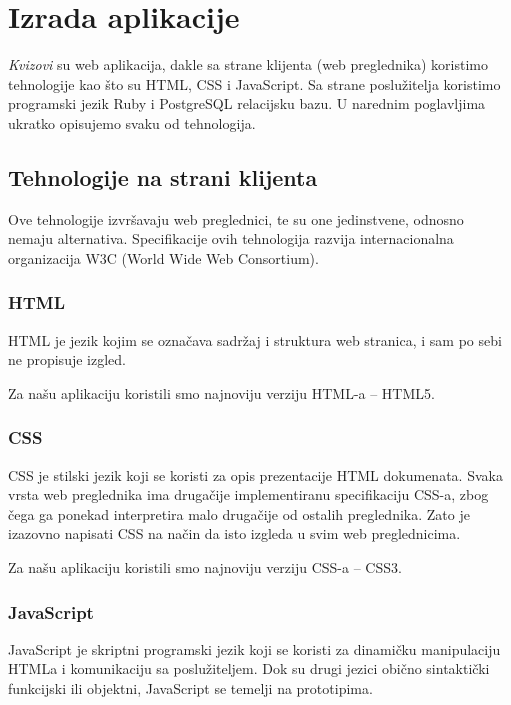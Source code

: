 \documentclass{scrreprt}
\begin{document}
\section{Izrada aplikacije}

\emph{Kvizovi} su web aplikacija, dakle sa strane klijenta (web preglednika)
koristimo tehnologije kao što su HTML, CSS i JavaScript. Sa strane poslužitelja
koristimo programski jezik Ruby i PostgreSQL relacijsku bazu. U narednim
poglavljima ukratko opisujemo svaku od tehnologija.

\subsection{Tehnologije na strani klijenta}

Ove tehnologije izvršavaju web preglednici, te su one jedinstvene, odnosno
nemaju alternativa. Specifikacije ovih tehnologija razvija internacionalna
organizacija W3C (World Wide Web Consortium).

\subsubsection{HTML}

HTML je jezik kojim se označava sadržaj i struktura web stranica, i sam po sebi
ne propisuje izgled.

Za našu aplikaciju koristili smo najnoviju verziju HTML-a -- HTML5.

\subsubsection{CSS}

CSS je stilski jezik koji se koristi za opis prezentacije HTML dokumenata. Svaka
vrsta web preglednika ima drugačije implementiranu specifikaciju CSS-a, zbog
čega ga ponekad interpretira malo drugačije od ostalih preglednika. Zato je
izazovno napisati CSS na način da isto izgleda u svim web preglednicima.

Za našu aplikaciju koristili smo najnoviju verziju CSS-a -- CSS3.

\subsubsection{JavaScript}

JavaScript je skriptni programski jezik koji se koristi za dinamičku
manipulaciju HTMLa i komunikaciju sa poslužiteljem. Dok su drugi jezici obično
sintaktički funkcijski ili objektni, JavaScript se temelji na prototipima.
\end{document}
